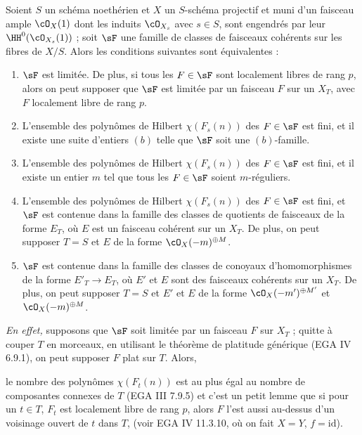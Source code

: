 \begin{thm}\label{thm:1.13} Soient $S$ un schéma noethérien et $X$ un $S$-schéma projectif et muni d'un faisceau ample $\cO_X(1)$ dont les induits $\cO_{X_s}$ avec $s \in S$, sont engendrés par leur $\HH^0(\cO_{X_s}(1))$ ; soit $\sF$ une famille de classes de faisceaux cohérents sur les fibres de $X/S$. Alors les conditions suivantes sont équivalentes :
\begin{enumerate}[label={\roman*)}]
\item $\sF$ est limitée. De plus, si tous les $F \in \sF$ sont localement libres de rang $p$, alors on peut supposer que $\sF$ est limitée par un faisceau $F$ sur un $X_T$, avec $F$ localement libre de rang $p$.
\item L'ensemble des polynômes de Hilbert $\chi(F_s(n))$ des $F \in \sF$ est fini, et il existe une suite d'entiers $(b)$ telle que $\sF$ soit une $(b)$-famille.
\item L'ensemble des polynômes de Hilbert $\chi(F_s(n))$ des $F \in \sF$ est fini, et il existe un entier $m$ tel que tous les $F \in \sF$ soient $m$-réguliers.
\item L'ensemble des polynômes de Hilbert $\chi(F_s(n))$ des $F \in \sF$ est fini, et $\sF$ est contenue dans la famille des classes de quotients de faisceaux de la forme $E_T$, où $E$ est un faisceau cohérent sur un $X_T$. De plus, on peut supposer $T=S$ et $E$ de la forme $\cO_X(-m)^{\oplus M}$.
\item $\sF$ est contenue dans la famille des classes de conoyaux d'homomorphismes de la forme $E'_T \to E_T$, où $E'$ et $E$ sont des faisceaux cohérents sur un $X_T$. De plus, on peut supposer $T=S$ et $E'$ et $E$ de la forme $\cO_X(-m')^{\oplus M'}$ et $\cO_X(-m)^{\oplus M}$.
\end{enumerate}
\end{thm}

\noindent\textit{En effet,} supposons que $\sF$ soit limitée par un faisceau $F$ sur $X_T$ ; quitte à couper $T$ en morceaux, en utilisant le théorème de platitude générique (EGA IV 6.9.1), on peut supposer $F$ plat sur $T$. Alors,

\noindent
le nombre des polynômes $\chi(F_t(n))$ est au plus égal au nombre de composantes connexes de $T$ (EGA III 7.9.5) et c'est un petit lemme que si pour un $t \in T$, $F_t$ est localement libre de rang $p$, alors $F$ l'est aussi au-dessus d'un voisinage ouvert de $t$ dans $T$, (voir EGA IV 11.3.10, où on fait $X=Y$, $f=\mathrm{id}$).

